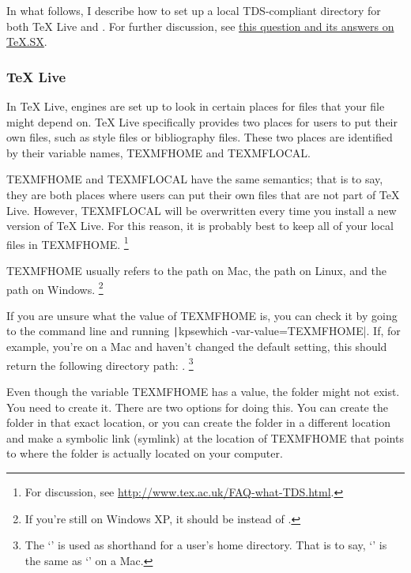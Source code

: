 In what follows, I describe how to set up a local TDS-compliant directory for both TeX Live and .
For further discussion, see \href{http://tex.stackexchange.com/q/1137/32888}{this question and its answers on TeX.SX}.

\subsubsection{TeX Live}
\label{subsubsec:local-files:tex-live}

In TeX Live, engines are set up to look in certain places for files that your  file might depend on.
TeX Live specifically provides two places for users to put their own files, such as style files or bibliography files.
These two places are identified by their variable names, TEXMFHOME and TEXMFLOCAL.

TEXMFHOME and TEXMFLOCAL have the same semantics; that is to say, they are both places where users can put their own files that are not part of TeX Live.
However, TEXMFLOCAL will be overwritten every time you install a new version of TeX Live.
For this reason, it is probably best to keep all of your local files in TEXMFHOME.%
\footnote{%
For discussion, see \url{http://www.tex.ac.uk/FAQ-what-TDS.html}.%
}

TEXMFHOME usually refers to the path  on Mac, the path  on Linux, and the path  on Windows.%
\footnote{%
If you're still on Windows XP, it should be  instead of .%
}

If you are unsure what the value of TEXMFHOME is, you can check it by going to the command line and running \texttt|kpsewhich -var-value=TEXMFHOME|.
If, for example, you're on a Mac and haven't changed the default setting, this should return the following directory path: .%
\footnote{%
The `\Directory{\textasciitilde}' is used as shorthand for a user's home directory.
That is to say, `' is the same as `' on a Mac.%
}

Even though the variable TEXMFHOME has a value, the folder might not exist.
You need to create it.
There are two options for doing this.
You can create the folder in that exact location, or you can create the folder in a different location and make a symbolic link (symlink) at the location of TEXMFHOME that points to where the folder is actually located on your computer.

